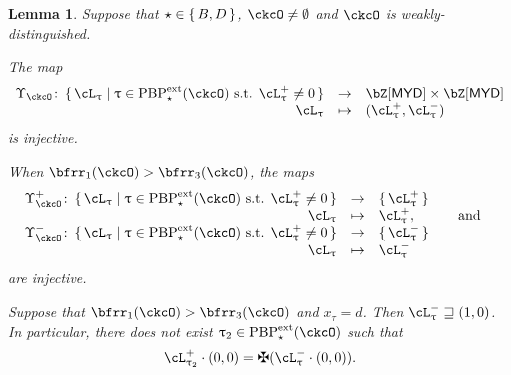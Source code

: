 \documentclass[12pt,a4paper]{amsart}
\newcommand{\pr}{\mathrm{pr}}
\def\MYD{{\mathsf{MYD}}}
\numberwithin{equation}{section}
\newtheorem{lem}[thm]{Lemma}
\theoremstyle{remark}
\def\PBPes{\mathrm{PBP}^{\mathrm{ext}}_{\star}}
\def\pUpsilon{\Upsilon^+}
\def\nUpsilon{\Upsilon^-}
\begin{document}
\begin{lem}\label{lem:BD3}
Suppose that $\star \in \set{B,D}$, $\ckcO \neq \emptyset$ and $\ckcO$ is weakly-distinguished.
\begin{enuma}
    \item The map
    \begin{equation}\label{eq:up}
      \begin{array}{rcl}
        \Upsilon_{\ckcO} \colon \set{\ac_{\uptau}|\uptau\in \PBPes(\ckcO)
        \text{ s.t. } \pac{\uptau}\neq 0 }
        & \rightarrow &  \bZ[\MYD]\times \bZ[\MYD] \\ %
        \ac_{\uptau} &\mapsto & (\pac{\uptau},\nac{\uptau})
      \end{array}
    \end{equation}
    is injective.
  \item When $\bfrr_{1}(\ckcO)> \bfrr_{3}(\ckcO)$, the maps
    \[
      \begin{array}{rcl}
        \pUpsilon_{\ckcO} \colon \set{\ac_{\uptau}|\uptau\in \PBPes(\ckcO)
        \text{ s.t. } \pac{\uptau}\neq 0 } &\rightarrow  & \set{\pac{\uptau}}\\
       \ac_{\uptau} & \mapsto & \pac{\uptau},\qquad \AND\\
        \nUpsilon_{\ckcO} \colon \set{\ac_{\uptau}|\uptau\in \PBPes(\ckcO)
        \text{ s.t. } \pac{\uptau}\neq 0} &\rightarrow & \set{\nac{\uptau}}\\
       \ac_{\uptau} &\mapsto & \nac{\uptau}
     \end{array}
   \]
    are injective.
    \item Suppose that $\bfrr_{1}(\ckcO)> \bfrr_{3}(\ckcO)$ and $x_{\tau}=d$.
    Then $\nac{\uptau}\sqsupseteq (1,0)$.
    In particular, there does not exist $\uptau_2\in \PBPes(\ckcO)$ such that
    \begin{equation}\label{eq:pnac}
     \pac{\uptau_2} \cdot (0,0) = \maltese (\nac{\uptau}\cdot (0,0)).
    \end{equation}
  \end{enuma}
\end{lem}
\end{document}
